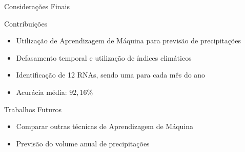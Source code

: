 \begin{frame}{Considerações Finais}
 \begin{block}{Contribuições}
 \begin{itemize}
   \item Utilização de Aprendizagem de Máquina para previsão de precipitações
   \item Defasamento temporal e utilização de índices climáticos
   \item Identificação de 12 RNAs, sendo uma para cada mês do ano
   \item Acurácia média: $92,16\%$
 \end{itemize}
 \end{block}
 \pause
 \begin{block}{Trabalhos Futuros}
   \begin{itemize}
     \item Comparar outras técnicas de Aprendizagem de Máquina
     \item Previsão do volume anual de precipitações
   \end{itemize}
 \end{block}
\end{frame}
